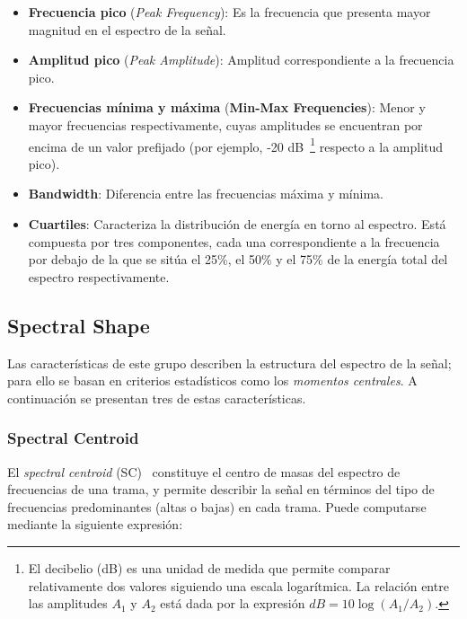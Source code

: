 \begin{itemize}
    \label{itemize:basic-spectral-features}
    \item \textbf{Frecuencia pico} (\textit{Peak Frequency}): Es la frecuencia que presenta mayor magnitud en el espectro de la señal.
    \item \textbf{Amplitud pico} (\textit{Peak Amplitude}): Amplitud correspondiente a la frecuencia pico.
    \item \textbf{Frecuencias mínima y máxima} (\textbf{Min-Max Frequencies}): Menor y mayor frecuencias respectivamente, cuyas amplitudes se encuentran por encima de un valor prefijado (por ejemplo, -20 dB~\footnote{El decibelio (dB) es una unidad de medida que permite comparar relativamente dos valores siguiendo una escala logarítmica.
    La relación entre las amplitudes $A_1$ y $A_2$ está dada por la expresión $dB = 10\log(A_1/A_2)$.} respecto a la amplitud pico).
    \item \textbf{Bandwidth}: Diferencia entre las frecuencias máxima y mínima.
    \item \textbf{Cuartiles}: Caracteriza la distribución de energía en torno al espectro.
    Está compuesta por tres componentes, cada una correspondiente a la frecuencia por debajo de la que se sitúa el 25\%, el 50\% y el 75\% de la energía total del espectro respectivamente.
\end{itemize}

\subsection{Spectral Shape}\label{subsec:spectralShape}

Las características de este grupo describen la estructura del espectro de la señal;
para ello se basan en criterios estadísticos como los \textit{momentos centrales}.
A continuación se presentan tres de estas características.

\subsubsection{Spectral Centroid}\label{subsubsec:spectralCentroid}

El \textit{spectral centroid} (SC)~\cite{Fagerlund07,Kim05,Lasseck14,Manjunath02,Peters04} constituye el centro de masas del espectro de frecuencias de una trama, y permite describir la señal en términos del tipo de frecuencias predominantes (altas o bajas) en cada trama.
Puede computarse mediante la siguiente expresión:

